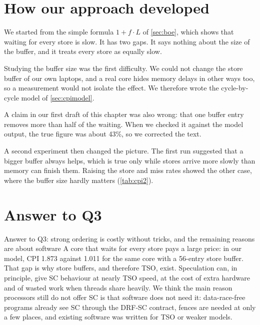 \section{How our approach developed}
\label{sec:q3history}

We started from the simple formula $1 + f\cdot L$ of \cref{sec:boe}, which shows that waiting for every store is slow. It has two gaps. It says nothing about the size of the buffer, and it treats every store as equally slow.

Studying the buffer size was the first difficulty. We could not change the store buffer of our own laptops, and a real core hides memory delays in other ways too, so a measurement would not isolate the effect. We therefore wrote the cycle-by-cycle model of \cref{sec:cpimodel}.

A claim in our first draft of this chapter was also wrong: that one buffer entry removes more than half of the waiting. When we checked it against the model output, the true figure was about 43\%, so we corrected the text.

A second experiment then changed the picture. The first run suggested that a bigger buffer always helps, which is true only while stores arrive more slowly than memory can finish them. Raising the store and miss rates showed the other case, where the buffer size hardly matters (\cref{tab:cpi2}).

\section{Answer to Q3}
\label{sec:q3}

\begin{resultbox}{Answer to Q3: strong ordering is costly without tricks, and the remaining reasons are about software}
A core that waits for every store pays a large price: in our model, CPI 1.873 against 1.011 for the same core with a 56-entry store buffer. That gap is why store buffers, and therefore TSO, exist. Speculation can, in principle, give SC behaviour at nearly TSO speed, at the cost of extra hardware and of wasted work when threads share heavily. We think the main reason processors still do not offer SC is that software does not need it: data-race-free programs already see SC through the DRF-SC contract, fences are needed at only a few places, and existing software was written for TSO or weaker models.
\end{resultbox}

